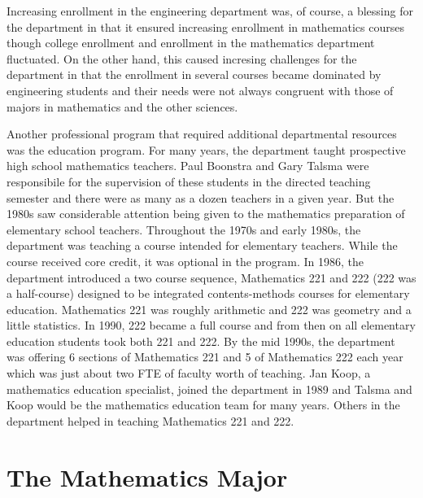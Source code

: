 \documentclass[
]{book}
\begin{document}
Increasing enrollment in the engineering department was, of course, a blessing for the department in that it ensured increasing enrollment in mathematics courses though college enrollment and enrollment in the mathematics department fluctuated. On the other hand, this caused incresing challenges for the department in that the enrollment in several courses became dominated by engineering students and their needs were not always congruent with those of majors in mathematics and the other sciences.

Another professional program that required additional departmental resources was the education program. For many years, the department taught prospective high school mathematics teachers. Paul Boonstra and Gary Talsma were responsibile for the supervision of these students in the directed teaching semester and there were as many as a dozen teachers in a given year. But the 1980s saw considerable attention being given to the mathematics preparation of elementary school teachers.
Throughout the 1970s and early 1980s, the department was teaching a course intended for elementary teachers. While the course received core credit, it was optional in the program. In 1986, the department introduced a two course sequence, Mathematics 221 and 222 (222 was a half-course) designed to be integrated contents-methods courses for elementary education. Mathematics 221 was roughly arithmetic and 222 was geometry and a little statistics. In 1990, 222 became a full course and from then on all elementary education students took both 221 and 222. By the mid 1990s, the department was offering 6 sections of Mathematics 221 and 5 of Mathematics 222 each year which was just about two FTE of faculty worth of teaching. Jan Koop, a mathematics education specialist, joined the department in 1989 and Talsma and Koop would be the mathematics education team for many years. Others in the department helped in teaching Mathematics 221 and 222.

\hypertarget{the-mathematics-major}{%
\section{The Mathematics Major}\label{the-mathematics-major}}
\end{document}
